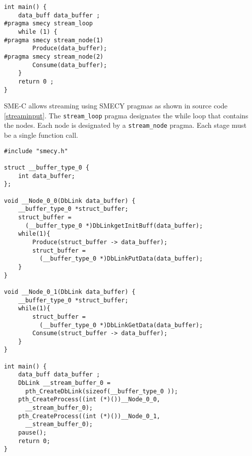 \documentclass [A4]{article}
\begin{document}
	\begin{lstlisting}[label=streaminput,caption={Input code with streaming pragmas. Definitions of functions \texttt{Produce} and \texttt{Consume} are not shown.}]
int main() {
	data_buff data_buffer ;
#pragma smecy stream_loop
	while (1) {
#pragma smecy stream_node(1)
		Produce(data_buffer);
#pragma smecy stream_node(2)
		Consume(data_buffer);
	}
	return 0 ;
}
	\end{lstlisting}
	
	SME-C allows streaming using SMECY pragmas as shown in source code \ref{streaminput}. The \verb+stream_loop+ pragma designates the while loop that contains the nodes. Each node is designated by a \verb+stream_node+ pragma. Each stage must be a single function call.
	
	\begin{lstlisting}[label=streamoutput,caption={Possible output code. Definitions of functions \texttt{Produce} and \texttt{Consume} are not shown.}]
#include "smecy.h" 

struct __buffer_type_0 {
	int data_buffer;
};

void __Node_0_0(DbLink data_buffer) {
	__buffer_type_0 *struct_buffer;
	struct_buffer =
	  (__buffer_type_0 *)DbLinkgetInitBuff(data_buffer);
	while(1){
		Produce(struct_buffer -> data_buffer);
		struct_buffer = 
		  (__buffer_type_0 *)DbLinkPutData(data_buffer);
	}
}

void __Node_0_1(DbLink data_buffer) {
	__buffer_type_0 *struct_buffer;
	while(1){
		struct_buffer = 
		  (__buffer_type_0 *)DbLinkGetData(data_buffer);
		Consume(struct_buffer -> data_buffer);
	}
}

int main() {
	data_buff data_buffer ;
	DbLink __stream_buffer_0 = 
	  pth_CreateDbLink(sizeof(__buffer_type_0 ));
	pth_CreateProcess((int (*)())__Node_0_0,
	  __stream_buffer_0);
	pth_CreateProcess((int (*)())__Node_0_1,
	  __stream_buffer_0);
	pause();
	return 0;
}
	\end{lstlisting}
	
\end{document}
